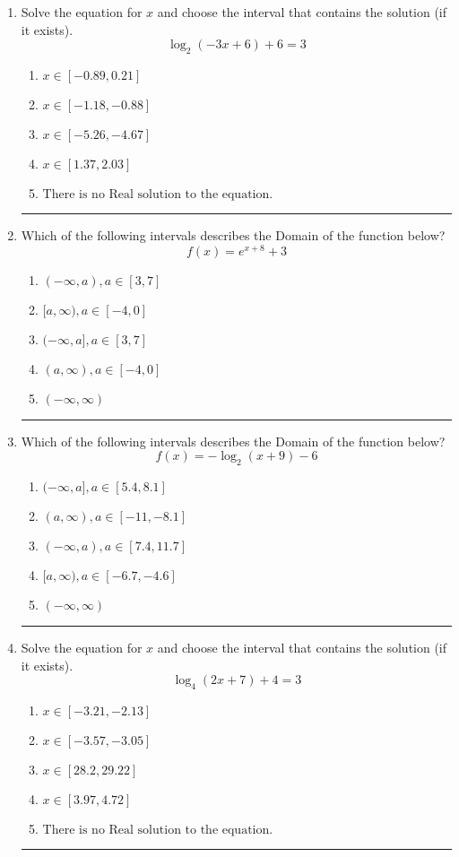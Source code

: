 \documentclass[14pt]{extbook}
\newcommand{\litem}[1]{\item#1\hspace*{-1cm}\rule{\textwidth}{0.4pt}}
\begin{document}
\begin{enumerate}
{\begin{enumerate}[label=\Alph*.]
\end{enumerate} }
\litem{
Solve the equation for $x$ and choose the interval that contains the solution (if it exists).\[ \log_{2}{(-3x+6)}+6 = 3 \]\begin{enumerate}[label=\Alph*.]
\item \( x \in [-0.89, 0.21] \)
\item \( x \in [-1.18, -0.88] \)
\item \( x \in [-5.26, -4.67] \)
\item \( x \in [1.37, 2.03] \)
\item \( \text{There is no Real solution to the equation.} \)

\end{enumerate} }
\litem{
Which of the following intervals describes the Domain of the function below?\[ f(x) = e^{x+8}+3 \]\begin{enumerate}[label=\Alph*.]
\item \( (-\infty, a), a \in [3, 7] \)
\item \( [a, \infty), a \in [-4, 0] \)
\item \( (-\infty, a], a \in [3, 7] \)
\item \( (a, \infty), a \in [-4, 0] \)
\item \( (-\infty, \infty) \)

\end{enumerate} }
\litem{
Which of the following intervals describes the Domain of the function below?\[ f(x) = -\log_2{(x+9)}-6 \]\begin{enumerate}[label=\Alph*.]
\item \( (-\infty, a], a \in [5.4, 8.1] \)
\item \( (a, \infty), a \in [-11, -8.1] \)
\item \( (-\infty, a), a \in [7.4, 11.7] \)
\item \( [a, \infty), a \in [-6.7, -4.6] \)
\item \( (-\infty, \infty) \)

\end{enumerate} }
\litem{
Solve the equation for $x$ and choose the interval that contains the solution (if it exists).\[ \log_{4}{(2x+7)}+4 = 3 \]\begin{enumerate}[label=\Alph*.]
\item \( x \in [-3.21, -2.13] \)
\item \( x \in [-3.57, -3.05] \)
\item \( x \in [28.2, 29.22] \)
\item \( x \in [3.97, 4.72] \)
\item \( \text{There is no Real solution to the equation.} \)


\end{enumerate}}
\end{enumerate}
\end{document}
